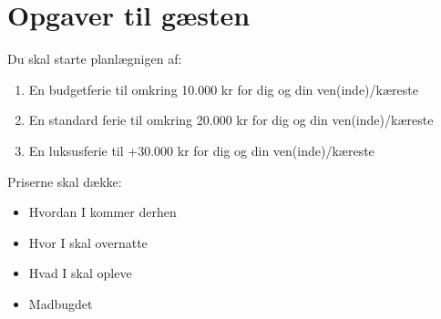 \chapter{Opgaver til gæsten}
\label{app:OpgaverTilGaesten}
%
Du skal starte planlægnigen af:\blankline
\begin{enumerate}
	\item En budgetferie til omkring 10.000 kr for dig og din ven(inde)/kæreste
	\item En standard ferie til omkring 20.000 kr for dig og din ven(inde)/kæreste
	\item En luksusferie til +30.000 kr for dig og din ven(inde)/kæreste\blankline
\end{enumerate}
%
Priserne skal dække:\blankline
\begin{itemize}
	\item Hvordan I kommer derhen
	\item Hvor I skal overnatte
	\item Hvad I skal opleve
	\item Madbugdet
\end{itemize}